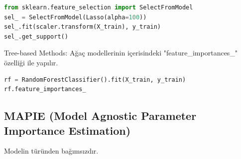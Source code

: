 \begin{lstlisting}[language=Python]
from sklearn.feature_selection import SelectFromModel
sel_ = SelectFromModel(Lasso(alpha=100))
sel_.fit(scaler.transform(X_train), y_train)
sel_.get_support()
\end{lstlisting}

Tree-based Methods: Ağaç modellerinin içerisindeki "feature\_importances\_" özelliği ile yapılır.
\begin{lstlisting}[language=Python]
rf = RandomForestClassifier().fit(X_train, y_train)
rf.feature_importances_
\end{lstlisting}

\newpage

\subsection{MAPIE (Model Agnostic Parameter Importance Estimation)}
Modelin türünden bağımsızdır.

\newpage